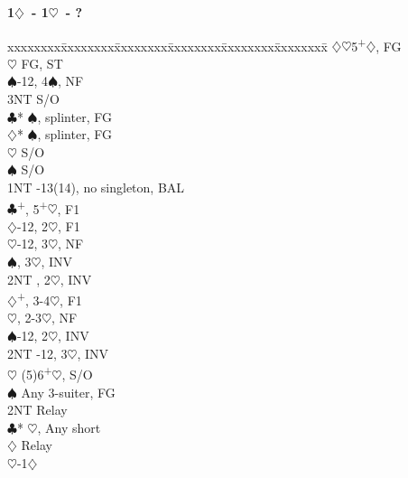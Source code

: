 \documentclass[10pt]{article}
\renewcommand{\c}{$\clubsuit$}
\renewcommand{\d}{$\diamondsuit$}
\newcommand{\h}{$\heartsuit$}
\newcommand{\s}{$\spadesuit$}
\newcommand{\p}{\textsuperscript{+}}
\newenvironment{bidtable}[1][]
{\textbf{#1}
  \begin{adjustwidth}{1em}{}
    \addvspace{2pt}
    \begin{tabbing}
      xxxxxxxx\=xxxxxxxx\=xxxxxxxx\=xxxxxxxx\=xxxxxxxx\=xxxxxxxx\=\kill}
{\end{tabbing}\end{adjustwidth}\bigskip}%
\begin{document}
\begin{multicols*}{2}
\begin{bidtable}[1\d\ - 1\h\ - ?]
                \d  {}\h 5\p\d, FG                           \\
                \h  \> FG, ST                                  \\
                \s  {}-12, 4\s, NF                          \\
                \> 3NT  \> S/O                                     \\
                \c* {}\s, splinter, FG                       \\
                \d* {}\s, splinter, FG                       \\
                \h  \> S/O                                     \\
                \s  \> S/O                                     \\
1NT             -13(14), no singleton, BAL                    \\
                \c  {}\p, 5\p\h, F1                          \\
                \>      \d      {}-12, 2\h, F1              \\
                \>      \h      {}-12, 3\h, NF              \\
                \>      \s      {}, 3\h, INV                \\
                \>      \> 2NT      , 2\h, INV                \\
                \d  {}\p, 3-4\h, F1                          \\
                \>      \h      {}, 2-3\h, NF               \\
                \>      \s      {}-12, 2\h, INV             \\
                \>      \> 2NT      -12, 3\h, INV             \\
                \h  \> (5)6\p\h, S/O                           \\
                \s  \> Any 3-suiter, FG                        \\
                \>      \> 2NT      \> Relay                       \\
                \>      \>          \c* {}\h, Any short      \\
                \>      \>          \>      \d \> Relay        \\
                \>      \>          \>      \>     \h {}-1\d \\

\end{bidtable}
\end{multicols*}
\end{document}
